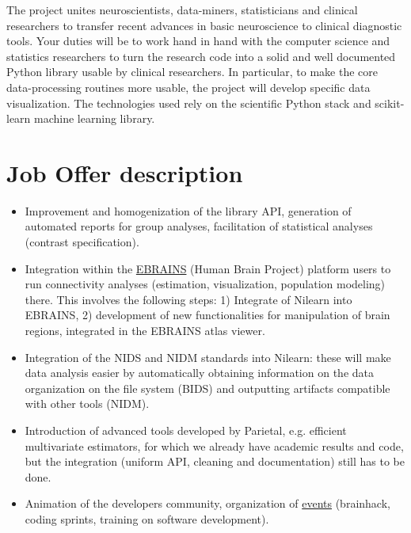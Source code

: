 \documentclass{article}
\begin{document}
The project unites neuroscientists, data-miners, statisticians and
clinical researchers to transfer recent advances in basic neuroscience
to clinical diagnostic tools.
%
Your duties will be to work hand in hand
with the computer science and statistics researchers to turn the
research code into a solid and well documented Python library usable
by clinical researchers.
%
In particular, to make the core data-processing routines more usable,
the project will develop specific data visualization. The technologies
used rely on the scientific Python stack and scikit-learn machine
learning library.

\section*{Job Offer description}
\begin{itemize}
\item Improvement and homogenization of the library API, generation
  of automated reports for group analyses, facilitation of statistical
  analyses (contrast specification).
\item Integration within the \href{https://ebrains.eu}{EBRAINS} (Human
  Brain Project) platform users to run connectivity analyses
  (estimation, visualization, population modeling) there. This
  involves the following steps: 1) Integrate of Nilearn into EBRAINS,
  2) development of new functionalities for manipulation of brain
  regions, integrated in the EBRAINS atlas viewer.
  \item Integration of the NIDS and NIDM standards into Nilearn: these
    will make data analysis easier by automatically obtaining
    information on the data organization on the file system (BIDS) and
    outputting artifacts compatible with other tools (NIDM).
   \item Introduction of advanced tools developed by
     Parietal, e.g. efficient multivariate estimators, for which we
     already have academic results and code, but the integration
     (uniform API, cleaning and documentation) still has to be done.
   \item Animation of the developers community, organization of \href{https://nilearn.github.io/dev-days-2020/}{events}
     (brainhack, coding sprints, training on software development).
\end{itemize}
\end{document}
